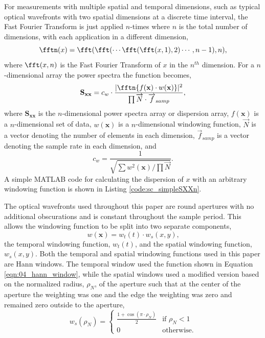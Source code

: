 For measurements with multiple spatial and temporal dimensions, such as typical optical wavefronts with two spatial dimensions at a discrete time interval, the Fast Fourier Transform is just applied $n$-times where $n$ is the total number of dimensions, with each application in a different dimension,
\begin{equation}
  \fftn(x) = \fft(\fft(\cdots\fft(\fft(x,1),2)\cdots,n-1),n) \textrm{,}
  \label{eqn:04_fftn}
\end{equation}
where $\fft(x,n)$ is the Fast Fourier Transform of $x$ in the $n^{th}$ dimension.
For a $n$-dimensional array the power spectra the function becomes,
\begin{equation}
  \mathbf{S_{xx}} = c_w\cdot\frac{|\fftn\{f(\mathbf{x})\cdot w(\mathbf{x})\}|^2}{\prod{\overrightarrow{N}\cdot \overrightarrow{f}_{samp}}} \textrm{,}
  \label{eqn:04_sxxn}
\end{equation}
where $\mathbf{S_{xx}}$ is the $n$-dimensional power spectra array or dispersion array, $f(\mathbf{x})$ is a $n$-dimensional set of data, $w(\mathbf{x})$ is a $n$-dimensional windowing function, $\overrightarrow{N}$ is a vector denoting the number of elements in each dimension, $\overrightarrow{f}_{samp}$ is a vector denoting the sample rate in each dimension, and
\begin{equation}
  c_w = \frac{1}{\sqrt{\sum w^2(\mathbf{x})/\prod{\overrightarrow{N}}}} \textrm{.}
  \label{eqn:04_windown}
\end{equation}
A simple MATLAB code for calculating the dispersion of $x$ with an arbitrary windowing function is shown in Listing \ref{code:sc_simpleSXXn}.

The optical wavefronts used throughout this paper are round apertures with no additional obscurations and is constant throughout the sample period.
This allows the windowing function to be split into two separate components,
\begin{equation}
  w(\mathbf{x}) = w_t(t)\cdot w_s(x,y) \textrm{,}
  \label{eqn:04_window_sep}
\end{equation}
the temporal windowing function, $w_t(t)$, and the spatial windowing function, $w_s(x,y)$.
Both the temporal and spatial windowing functions used in this paper are Hann windows.
The temporal window used the function shown in Equation \ref{eqn:04_hann_window}, while the spatial windows used a modified version based on the normalized radius, $\rho_N$, of the aperture such that at the center of the aperture the weighting was one and the edge the weighting was zero and remained zero outside to the aperture,
\begin{equation}
  w_s(\rho_N) =
  \begin{cases}
    \frac{1+\cos(\pi\cdot\rho_N)}{2} & \textrm{if } \rho_N < 1 \\
    0 & \textrm{otherwise.}
  \end{cases}
  \label{eqn:04_window_space}
\end{equation}

